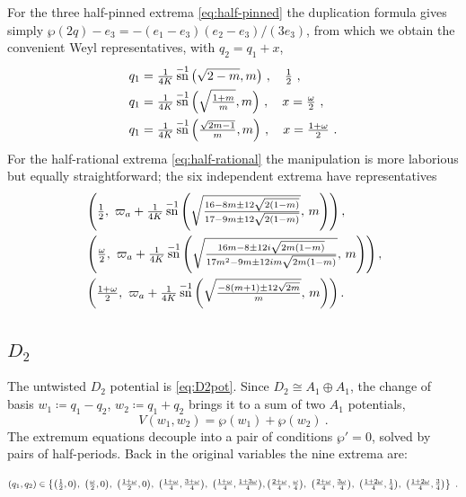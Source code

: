\documentclass[aps, prx, nofootinbib, twocolumn,amsfonts,amsmath,amssymb,mathtools,superscriptaddress,preprintnumbers,floatfix,reprint]{revtex4-2}
\DeclareMathOperator{\sn}{sn}
\begin{document}
For the three half-pinned extrema \eqref{eq:half-pinned} the duplication
formula gives simply $\wp(2q)-e_3=-(e_1-e_3)(e_2-e_3)/(3e_3)$, from which we obtain the
convenient Weyl representatives, with $q_2=q_1+x$,
\begin{align}\label{eq:B2CMhalfpinned}
  q_1&=\tfrac{1}{4K}\sn^{-1}\big(\sqrt{2-m},m\big)\ , \quad\tfrac12\ ,\notag\\
  q_1&=\tfrac{1}{4K}\sn^{-1}\Big(\sqrt{\tfrac{1+m}{m}},m\Big)\ ,
  \quad x=\tfrac{\omega}{2}\ ,\\
  q_1&=\tfrac{1}{4K}\sn^{-1}\Big(\tfrac{\sqrt{2m-1}}{m},m\Big)\ ,
  \quad x=\tfrac{1+\omega}{2}\ .\notag
\end{align}
For the half-rational extrema \eqref{eq:half-rational} the manipulation is more
laborious but equally straightforward; the six independent extrema have
representatives
{\small
\begin{align}\label{eq:B2halfrational}
  &\left(\tfrac12,\ \varpi_a+\tfrac{1}{4K}\sn^{-1}
  \left(\sqrt{\tfrac{16-8m\pm12\sqrt{2(1-m)}}{17-9m\pm12\sqrt{2(1-m)}}},\,m
  \right)\right),\notag\\
  &\left(\tfrac{\omega}{2},\ \varpi_a+\tfrac{1}{4K}\sn^{-1}
  \left(\sqrt{\tfrac{16m-8\pm12i\sqrt{2m(1-m)}}
  {17m^2-9m\pm12im\sqrt{2m(1-m)}}},\,m\right)\right),\\
  &\left(\tfrac{1+\omega}{2},\ \varpi_a+\tfrac{1}{4K}\sn^{-1}
  \left(\sqrt{\tfrac{-8(m+1)\pm12\sqrt{2m}}{m}},\,m\right)\right).\notag
\end{align}}

\subsection{\texorpdfstring{$D_2$}{D2}}
\label{sub:D2CM}

The untwisted $D_2$ potential is \eqref{eq:D2pot}. Since $D_2\cong A_1\oplus
A_1$, the change of basis $w_1\coloneqq q_1-q_2$, $w_2\coloneqq q_1+q_2$ brings it to a sum of
two $A_1$ potentials,
\begin{equation}
  V(w_1,w_2)=\wp(w_1)+\wp(w_2)\ .
\end{equation}
The extremum equations decouple into a pair of conditions $\wp'=0$, solved by
pairs of half-periods. Back in the original variables the nine extrema are:
\begin{widetext}
\begin{equation}\label{eq:D2sols}
  (q_1,q_2)\in\left\{\big(\tfrac12,0\big),\ \big(\tfrac{\omega}{2},0\big),\
  \big(\tfrac{1+\omega}{2},0\big),\
  \big(\tfrac{1+\omega}{4},\tfrac{3+\omega}{4}\big),\
  \big(\tfrac{1+\omega}{4},\tfrac{1+3\omega}{4}\big),\\
  \big(\tfrac{2+\omega}{4},\tfrac{\omega}{4}\big),\
  \big(\tfrac{2+\omega}{4},\tfrac{3\omega}{4}\big),\
  \big(\tfrac{1+2\omega}{4},\tfrac14\big),\
  \big(\tfrac{1+2\omega}{4},\tfrac34\big)\right\}\ .
\end{equation}
\end{widetext}
\end{document}
